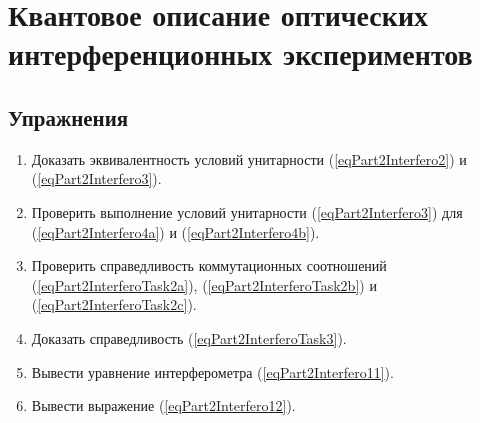 \chapter{Квантовое описание оптических интерференционных экспериментов}
\label{chInterfero}





\section{Упражнения}
\begin{enumerate}
\item Доказать эквивалентность условий унитарности
  (\ref{eqPart2Interfero2}) и  (\ref{eqPart2Interfero3}).
\item Проверить выполнение условий унитарности (\ref{eqPart2Interfero3}) для
  (\ref{eqPart2Interfero4a}) и  (\ref{eqPart2Interfero4b}).
\item Проверить справедливость коммутационных соотношений
  (\ref{eqPart2InterferoTask2a}), (\ref{eqPart2InterferoTask2b}) и
  (\ref{eqPart2InterferoTask2c}). 
\item Доказать справедливость (\ref{eqPart2InterferoTask3}).
\item Вывести уравнение интерферометра (\ref{eqPart2Interfero11}).
\item Вывести выражение (\ref{eqPart2Interfero12}).
\end{enumerate}

